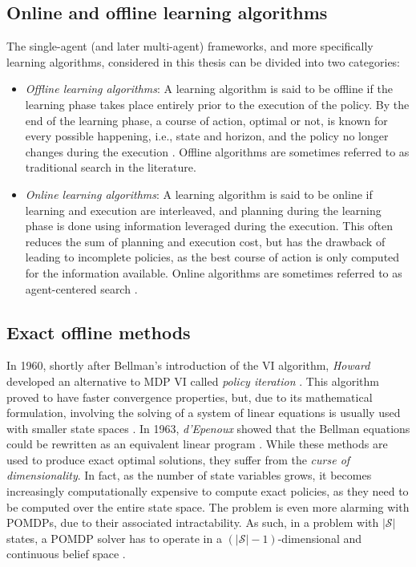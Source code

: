 \subsection{Online and offline learning algorithms}
\label{sec:onlineoffline}
The single-agent (and later multi-agent) frameworks, and more specifically learning algorithms, considered in this thesis can be divided into two categories:
\begin{itemize}
    \item \textit{Offline learning algorithms}: A learning algorithm is said to be offline if the learning phase takes place entirely prior to the execution of the policy. By the end of the learning phase, a course of action, optimal or not, is known for every possible happening, i.e., state and horizon, and the policy no longer changes during the execution \cite{offlineonline}. Offline algorithms are sometimes referred to as traditional search in the literature. %
    \item \textit{Online learning algorithms}: A learning algorithm is said to be online if learning and execution are interleaved, and planning during the learning phase is done using information leveraged during the execution. This often reduces the sum of planning and execution cost, but has the drawback of leading to incomplete policies, as the best course of action is only computed for the information available. Online algorithms are sometimes referred to as agent-centered search \cite{Koenig_2001}. %
\end{itemize}
\subsection{Exact offline methods}
In 1960, shortly after Bellman's introduction of the VI algorithm, \textit{Howard} developed an alternative to MDP VI called \textit{policy iteration} \cite{howard:1960}. This algorithm proved to have faster convergence properties, but, due to its mathematical formulation, involving the solving of a system of linear equations is usually used with smaller state spaces \cite{policyadv}. In 1963, \textit{d'Epenoux} showed that the Bellman equations could be rewritten as an equivalent linear program \cite{linprog}.
While these methods are used to produce exact optimal solutions, they suffer from the \textit{curse of dimensionality}. In fact, as the number of state variables grows, it becomes increasingly computationally expensive to compute exact policies, as they need to be computed over the entire state space. The problem is even more alarming with POMDPs, due to their associated intractability. As such, in a problem with $|\mathcal{S}|$ states, a POMDP solver has to operate in a $(|\mathcal{S}|-1)$-dimensional and continuous belief space \cite{Pineau-2003-8730}.

